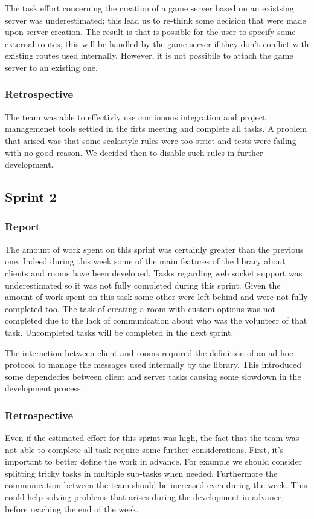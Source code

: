 The task effort concerning the creation of a game server based on an existsing server was underestimated; this lead us to re-think some decision that were made upon server creation. The result is that is possible for the user to specify some external routes, this will be handled by the game server if they don't conflict with existing routes used internally. 
However, it is not possibile to attach the game server to an existing one.





\subsubsection{Retrospective}
The team was able to effectivly use continuous integration and project managemenet tools settled in the firts meeting  and complete all tasks.
A problem that arised was that some scalastyle rules were too strict and tests were failing with no good reason. We decided then to disable such rules in further development.

\subsection{Sprint 2}
\subsubsection{Report}
The amount of work spent on this sprint was certainly greater than the previous one.
Indeed during this week some of the main features of the library about clients and rooms have been developed.
Tasks regarding web socket support was underestimated so it was not fully completed during this sprint. Given the amount of work spent on this task some other were left behind and were not fully completed too.
The task of creating a room with custom options was not completed due to the lack of communication about who was the volunteer of that task.
Uncompleted tasks will be completed in the next sprint.

The interaction between client and rooms required the definition of an ad hoc protocol to manage the messages used internally by the library. This introduced some dependecies between client and server tasks causing some slowdown in the development process.



\subsubsection{Retrospective}
Even if the estimated effort for this sprint was high, the fact that the team was not able to complete all task require some further considerations.
First, it's important to better define the work in advance. For example we should consider splitting tricky tasks in multiple sub-tasks when needed.
Furthermore the communication between the team should be increased even during the week.
This could help solving problems that arises during the development in advance, before reaching the end of the week.


